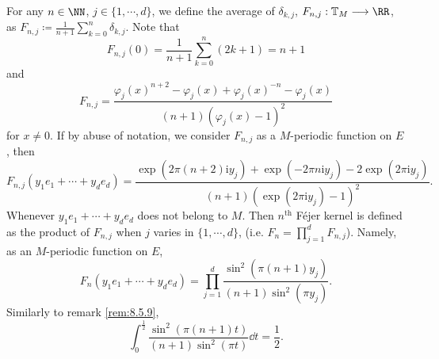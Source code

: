 \begin{remark}
    For any $n \in \NN$, $j \in \{1,\cdots,d\}$, we define the average of $\delta_{k,j}$, $F_{n,j} : \mathbb{T}_{M} \longrightarrow \RR$, as $F_{n,j} \coloneq \frac{1}{n + 1} \sum_{k=0}^{n} \delta_{k,j}$.
    Note that
    $$F_{n,j} (0) = \frac{1}{n + 1} \sum_{k=0}^{n} (2k + 1) = n + 1$$
    and
    $$F_{n,j} = \frac{\varphi_{j}(x)^{n+2} - \varphi_{j}(x) + \varphi_{j}(x)^{-n} - \varphi_{j}(x)}{(n+1)(\varphi_{j}(x) - 1)^2}$$
    for $x \neq 0$.
    If by abuse of notation, we consider $F_{n,j}$ as a $M$-periodic function on $E$, then
    $$F_{n,j}(y_1 e_1 + \cdots + y_d e_d) = \frac{\exp(2 \pi (n + 2) \mathrm{i} y_{j}) + \exp (-2\pi n \mathrm{i} y_{j}) - 2 \exp (2\pi \mathrm{i} y_{j})}{(n+1)(\exp(2 \pi \mathrm{i} y_{j}) - 1)^2}.$$
    Whenever $y_1 e_1 + \cdots + y_d e_d$ does not belong to $M$.
    Then $n^\text{th}$ F\'ejer kernel is defined as the product of $F_{n,j}$ when $j$ varies in $\{1,\cdots,d\}$, (i.e. $F_n = \prod_{j=1}^{d} F_{n,j}$).
    Namely, as an $M$-periodic function on $E$,
    $$F_n(y_1 e_1 + \cdots + y_d e_d) = \prod_{j=1}^{d}\frac{\sin^2(\pi (n + 1)y_{j})}{(n+1)\sin^2(\pi y_{j})}.$$
    Similarly to remark \ref{rem:8.5.9},
    $$\int_{0}^{\frac{1}{2}} \frac{\sin^2(\pi(n+1)t)}{(n+1)\sin^2(\pi t)} \dd t = \frac{1}{2}.$$
\end{remark}

